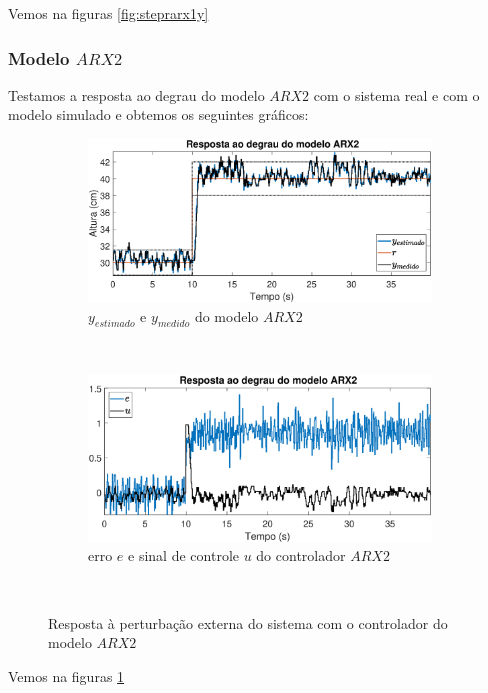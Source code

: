 Vemos na figuras \ref{fig:steprarx1y}


\subsubsection{Modelo $ARX2$}
Testamos a resposta ao degrau do modelo $ARX2$ com o sistema real e com o modelo simulado e obtemos os seguintes gráficos:
\begin{figure}[htb]
	\centering
	\begin{subfigure}[t]{0.48\textwidth}
		\includegraphics[width=1\linewidth]{steprarx2y}
		\caption[$y_{estimado}$ e $y_{medido}$ do modelo $ARX2$]{$y_{estimado}$ e $y_{medido}$ do modelo $ARX2$}
		\label{fig:steprarx2y}
	\end{subfigure}
	~ %
	\begin{subfigure}[t]{0.48\textwidth}
		\includegraphics[width=1\linewidth]{steprarx2e}
		\caption[erro $e$ e sinal de controle $u$ do controlador $ARX2$]{erro $e$ e sinal de controle $u$ do controlador $ARX2$}
		\label{fig:steprarx2e}
	\end{subfigure}
	~ %
	
	\caption{Resposta à perturbação externa do sistema com o controlador do modelo $ARX2$}\label{fig:steprarx2}
\end{figure}
Vemos na figuras \ref{fig:steprarx2y}

